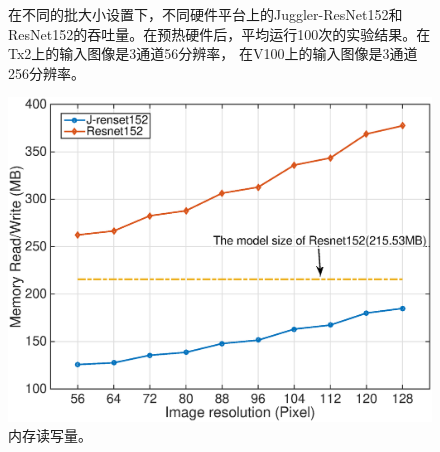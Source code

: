 \begin{figure}[t]
	\centering
	\caption{在不同的批大小设置下，不同硬件平台上的Juggler-ResNet152和ResNet152的吞吐量。在预热硬件后，平均运行100次的实验结果。在Tx2上的输入图像是3通道56分辨率， 在V100上的输入图像是3通道256分辨率。}
	\label{throughput}
\end{figure}

\begin{figure}[h]
	\centering
	\includegraphics[width=1\textwidth]{figures/mem_WR.eps}
	\caption{内存读写量。}
	\label{memWR}
\end{figure}



